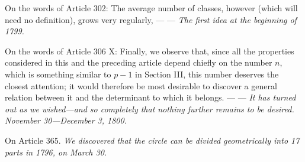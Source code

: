 On the words of Article 302: The average number of classes, however (which will need no definition), grows very regularly, — — \textit{The first idea at the beginning of 1799.}


On the words of Article 306 X: Finally, we observe that, since all the properties considered in this and the preceding article depend chiefly on the number \(n\), which is something similar to \(p-1\) in Section III, this number deserves the closest attention; it would therefore be most desirable to discover a general relation between it and the determinant to which it belongs. — — \textit{It has turned out as we wished—and so completely that nothing further remains to be desired. November 30—December 3, 1800.}


On Article 365. \textit{We discovered that the circle can be divided geometrically into 17 parts in 1796, on March 30.}


\clearpage
